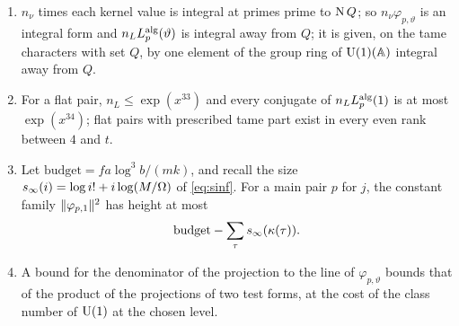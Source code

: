 \begin{proposition}\label{prop:algebraic-parts}
\begin{enumerate}[label=\textup{(\alph*)}]
\item $n_\nu$ times each kernel value is integral at primes prime to $\operatorname{N} Q$; so $n_\nu\varphi_{p,\vartheta}$ is an integral form and $n_LL^{\rm alg}_p(\vartheta)$ is integral away from $Q$; it is given, on the tame characters with set $Q$,
by one element of the group ring of $\operatorname{U}(1)(\mathbb{A})$ integral away from $Q$.
\item For a flat pair, $n_L\le\exp(x^{33})$ and every conjugate of $n_LL^{\rm alg}_p(1)$ is at most $\exp(x^{34})$; flat pairs with prescribed tame part exist in every even rank between $4$ and $t$.
\item Let $\mathrm{budget}=fa\log^3b/(mk)$, and recall the size $s_\infty(i)=\log i!+i\log(M/\Omega)$ of \eqref{eq:sinf}. For a main pair $p$ for $j$, the constant family $\lVert \varphi_{p,1}\rVert^2$ has height at most
\[
  \mathrm{budget}-\sum_\tau s_\infty(\kappa(\tau)).
\]
\item A bound for the denominator of the projection to the line of $\varphi_{p,\vartheta}$ bounds that of the product of the projections of two test forms, at the cost of the class number of $\operatorname{U}(1)$ at the chosen level.
\end{enumerate}
\end{proposition}

